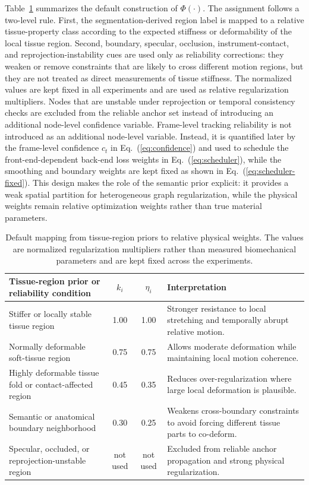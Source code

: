 \documentclass[pdflatex,sn-mathphys-num]{sn-jnl}
\begin{document}
Table~\ref{tab:physical_mapping} summarizes the default construction of $\Phi(\cdot)$. The assignment follows a two-level rule. First, the segmentation-derived region label is mapped to a relative tissue-property class according to the expected stiffness or deformability of the local tissue region. Second, boundary, specular, occlusion, instrument-contact, and reprojection-instability cues are used only as reliability corrections: they weaken or remove constraints that are likely to cross different motion regions, but they are not treated as direct measurements of tissue stiffness. The normalized values are kept fixed in all experiments and are used as relative regularization multipliers. Nodes that are unstable under reprojection or temporal consistency checks are excluded from the reliable anchor set instead of introducing an additional node-level confidence variable. Frame-level tracking reliability is not introduced as an additional node-level variable. Instead, it is quantified later by the frame-level confidence $c_t$ in Eq.~(\ref{eq:confidence}) and used to schedule the front-end-dependent back-end loss weights in Eq.~(\ref{eq:scheduler}), while the smoothing and boundary weights are kept fixed as shown in Eq.~(\ref{eq:scheduler-fixed}). This design makes the role of the semantic prior explicit: it provides a weak spatial partition for heterogeneous graph regularization, while the physical weights remain relative optimization weights rather than true material parameters.

\begin{table}[t]
\centering
\caption{Default mapping from tissue-region priors to relative physical weights. The values are normalized regularization multipliers rather than measured biomechanical parameters and are kept fixed across the experiments.}
\label{tab:physical_mapping}
\small
\renewcommand{\arraystretch}{1.15}
\begin{tabular}{p{}ccp{}}
\toprule
Tissue-region prior or reliability condition & $k_i$ & $\eta_i$ & Interpretation \\
\midrule
Stiffer or locally stable tissue region & 1.00 & 1.00 & Stronger resistance to local stretching and temporally abrupt relative motion. \\
Normally deformable soft-tissue region & 0.75 & 0.75 & Allows moderate deformation while maintaining local motion coherence. \\
Highly deformable tissue fold or contact-affected region & 0.45 & 0.35 & Reduces over-regularization where large local deformation is plausible. \\
Semantic or anatomical boundary neighborhood & 0.30 & 0.25 & Weakens cross-boundary constraints to avoid forcing different tissue parts to co-deform. \\
Specular, occluded, or reprojection-unstable region & not used & not used & Excluded from reliable anchor propagation and strong physical regularization. \\
\bottomrule
\end{tabular}
\end{table}
\end{document}

